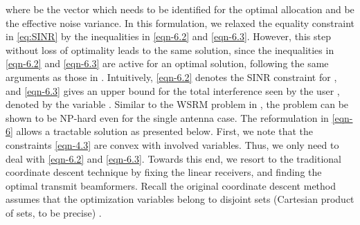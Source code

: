 where  be the vector which needs to be identified for the optimal allocation and  be the effective noise variance. In this formulation, we relaxed the equality constraint in \eqref{eq:SINR} by the inequalities in \eqref{eqn-6.2} and \eqref{eqn-6.3}. However, this step without loss of optimality leads to the same solution, since the inequalities in \eqref{eqn-6.2} and \eqref{eqn-6.3} are active for an optimal solution, following the same arguments as those in \cite{tran2012fast}. Intuitively, \eqref{eqn-6.2} denotes the \ac{SINR} constraint for , and \eqref{eqn-6.3} gives an upper bound for the total interference seen by the user , denoted by the variable . Similar to the \ac{WSRM} problem in \cite{tran2012fast}, the problem can be shown to be NP-hard even for the single antenna case. The reformulation in \eqref{eqn-6} allows a tractable solution as presented below. First, we note that the constraints \eqref{eqn-4.3} are convex with involved variables. Thus, we only need to deal with \eqref{eqn-6.2} and \eqref{eqn-6.3}. Towards this end, we resort to the traditional coordinate descent technique by fixing the linear receivers, and finding the optimal transmit beamformers. Recall the original coordinate descent method assumes that the optimization variables belong to disjoint sets (Cartesian product of sets, to be precise) \cite{xu2013block}.

